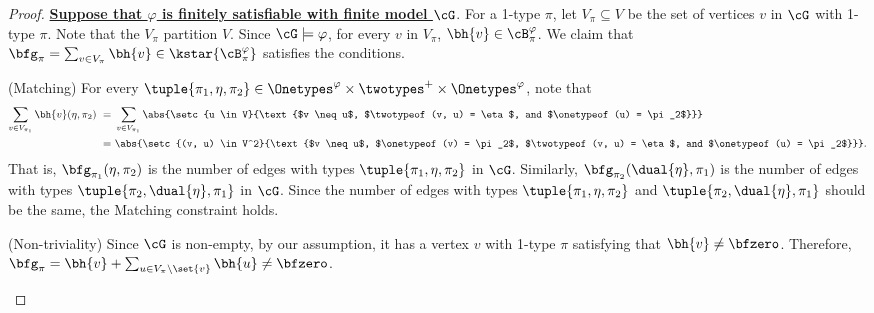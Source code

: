 \begin{proof}
    \textbf{\uline{Suppose that $\varphi$ is finitely satisfiable with finite model $\cG$}}.
    For a 1-type $\pi$,
    let $V_\pi \subseteq V$ be the set of vertices $v$ in $\cG$ with 1-type $\pi$.
    Note that the $V_\pi$ partition $V$.
    Since $\cG \models \varphi$, for every $v$ in $V_\pi$,
    $\bh{v} \in \cB^\varphi_\pi$.
    We claim that $\bfg_\pi = \sum_{v \in V_\pi} \bh{v} \in \kstar{\cB^\varphi_\pi}$ satisfies the conditions.

    \begin{compactitem}
        \item (Matching) 
        For every $\tuple{\pi_1, \eta, \pi_2} \in \Onetypes^\varphi \times \twotypes^+ \times \Onetypes^\varphi$,
        note that
        \begin{equation*}
            \begin{aligned}
                \sum_{v \in V_{\pi_1}} \bh{v}(\eta, \pi_2)
                \ =\ &
                \sum_{v \in V_{\pi_1}}
                \abs{\setc{u \in V}{\text{$v \neq u$, $\twotypeof(v, u) = \eta$, and $\onetypeof(u) = \pi_2$}}} \\
                \ =\ &
                \abs{\setc{(v, u) \in V^2}{\text{$v \neq u$, $\onetypeof(v) = \pi_2$, $\twotypeof(v, u) = \eta$, and $\onetypeof(u) = \pi_2$}}}.
            \end{aligned}
        \end{equation*}
        That is, $\bfg_{\pi_1}(\eta, \pi_2)$ is the number of edges with types $\tuple{\pi_1, \eta, \pi_2}$ in $\cG$.
        Similarly, $\bfg_{\pi_2}(\dual{\eta}, \pi_1)$ is the number of edges with types $\tuple{\pi_2, \dual{\eta}, \pi_1}$ in $\cG$.
        Since the number of edges with types $\tuple{\pi_1, \eta, \pi_2}$ and $\tuple{\pi_2, \dual{\eta}, \pi_1}$ should be the same, the Matching constraint holds.
        \item (Non-triviality)
        Since $\cG$ is non-empty, by our assumption,
        it has a vertex $v$ with 1-type $\pi$ satisfying that $\bh{v} \neq \bfzero$.
        Therefore,
        $\bfg_{\pi} = \bh{v} + \sum_{u \in V_{\pi} \setminus \set{v}} \bh{u} \neq \bfzero$.
    \end{compactitem}


\end{proof}
